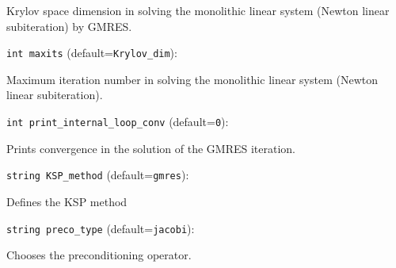Krylov space dimension in solving the monolithic linear
system (Newton linear subiteration) by GMRES.

\item\verb+int maxits+ {\rm(default=\verb|Krylov_dim|)}:

Maximum iteration number in solving the monolithic linear
system (Newton linear subiteration).

\item\verb+int print_internal_loop_conv+ {\rm(default=\verb|0|)}:

Prints convergence in the solution of the GMRES iteration. 

\item\verb+string KSP_method+ {\rm(default=\verb|gmres|)}:

Defines the KSP method

\item\verb+string preco_type+ {\rm(default=\verb|jacobi|)}:

Chooses the preconditioning operator. 

